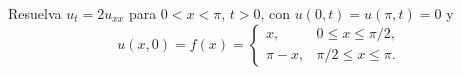 Resuelva $u_t=2u_{xx}$ para $0<x<\pi$, $t>0$, con $u(0,t)=u(\pi,t)=0$ y \[u(x,0)=f(x)=\begin{cases}x,&0\le x\le\pi/2,\\ \pi-x,&\pi/2\le x\le\pi.\end{cases}\]
